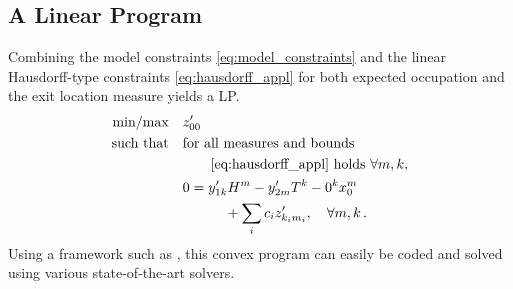 \subsection{A Linear Program}
Combining the model constraints \eqref{eq:model_constraints} and the linear Hausdorff-type constraints \eqref{eq:hausdorff_appl} for both expected occupation and the exit location measure yields a \ac{LP}.
\begin{equation}\label{eq:lp_for_fpt}
    \begin{split}
	    \text{min} / \text{max} \hspace{1em}&  z_{00}^{\prime} \\
        \text{such that}\hspace{1em} & \text{for all measures and bounds}\\
        &\qquad\eqref{eq:hausdorff_appl}\text{ holds }\forall m, k,\\
        & 0= y_{1k}' H^m -  y_{2m}'T^k - 0^k x_0^m \\
	    &\qquad\quad+\sum_i c_i  z_{k_i m_i}', \quad\forall m, k\,.
    \end{split}
\end{equation}
Using a framework such as , this convex program can easily be coded and solved using various state-of-the-art solvers.

